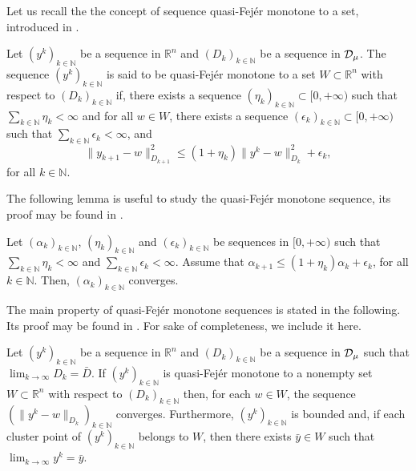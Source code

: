 Let us recall the the concept of  sequence  quasi-Fej\'er  monotone to a set, introduced in  \cite{CombettesVu2013}.
\begin{definition} \label{def:QuasiFejer}
	Let $(y^k)_{k\in\mathbb{N}}$ be a sequence in $\mathbb{R}^n$ and   $(D_k)_{k\in\mathbb{N}}$ be  a sequence in ${\cal D}_{\mu}$.  The sequence $(y^k)_{k\in\mathbb{N}}$ is said to be quasi-Fej\'er  monotone to a set $W\subset \mathbb{R}^n$ with respect to  $(D_k)_{k\in\mathbb{N}}$ if, there exists  a sequence $(\eta_k)_{k\in\mathbb{N}}\subset [0, +\infty)$ such that $\sum_{k\in \mathbb{N}}\eta_k<\infty$ and for  all $w\in W$, there exists a sequence $(\epsilon_k)_{k\in\mathbb{N}}\subset[0, +\infty)$ such that  $\sum_{k\in \mathbb{N}}\epsilon_k<\infty$, and
	\[
		\|y_{k+1}-w\|_{D_{k+1}}^2\leq (1+\eta_k) \|y^k-w\|_{D_k}^2+\epsilon_k,
	\]
	for    all $k\in \mathbb{N}$.
\end{definition}

The following lemma is useful to study the  quasi-Fej\'er  monotone sequence, its proof may be found in \cite[Lemma 2.2.2]{PolyakLivro1987}.
\begin{lemma} \label{le:pl}
	Let $(\alpha_k)_{k\in\mathbb{N}}$, $(\eta_k)_{k\in\mathbb{N}}$ and $(\epsilon_k)_{k\in\mathbb{N}}$ be sequences in $[0, +\infty)$  such that $\sum_{k\in \mathbb{N}}\eta_k<\infty$ and $\sum_{k\in \mathbb{N}}\epsilon_k<\infty$. Assume that $\alpha_{k+1}\leq (1 +\eta_k)\alpha_k+\epsilon_k$, for all $k\in {\mathbb N}$. Then, $(\alpha_k)_{k\in\mathbb{N}}$ converges.
\end{lemma}

The main property of  quasi-Fej\'er  monotone sequences is stated in the following. Its proof may be found in \cite[Proposition~3.2 and Theorem 3.3]{CombettesVu2013}. For sake of completeness, we include it here.

\begin{theorem}\label{teo.qf}
	Let $(y^k)_{k\in\mathbb{N}}$ be a sequence in $\mathbb{R}^n$ and   $(D_k)_{k\in\mathbb{N}}$ be  a sequence in ${\cal D}_{\mu}$ such that $\lim_{k\rightarrow\infty}D_k={\bar D}$.   If $(y^k)_{k\in\mathbb{N}}$ is quasi-Fej\'er  monotone to a nonempty set $W\subset  \mathbb{R}^n$ with respect to $(D_k)_{k\in\mathbb{N}}$ then,  for each  $w\in W$,    the sequence  $(\|y^{k}-w\|_{D_{k}})_{k\in\mathbb{N}}$ converges. Furthermore, $(y^k)_{k\in\mathbb{N}}$ is bounded and, if each  cluster point of $(y^k)_{k\in\mathbb{N}}$ belongs to $W$, then there exists ${\bar y}\in W$ such that $\lim_{k\rightarrow\infty}y^k={\bar y}$.
\end{theorem}

